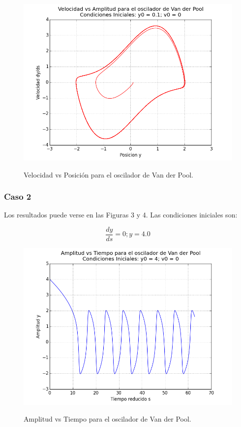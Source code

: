 \documentclass{article}
\begin{document}
\begin{figure}[h]
  \centering
  \includegraphics[scale = 0.5]{images/vel_vs_amplitud_01-0.png}
  \label{}
  \caption{Velocidad vs Posici\'on para el oscilador de Van der Pool.}
\end{figure}

\clearpage
\subsubsection{Caso 2}

Los resultados puede verse en las Figuras 3 y 4. Las condiciones iniciales son:

\begin{equation}
\dfrac{dy}{ds} = 0; y = 4.0
\label{eq:cond_inicial_2}  
\end{equation}

\begin{figure}[h]
  \centering
  \includegraphics[scale = 0.4]{images/ampl_vs_tiempo_4-0.png}
  \label{}
  \caption{Amplitud vs Tiempo para el oscilador de Van der Pool.}
\end{figure}
\end{document}
